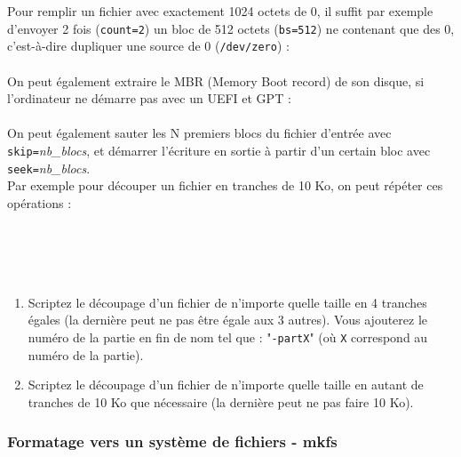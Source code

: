 Pour remplir un fichier avec exactement 1024 octets de $ 0 $, il suffit par exemple d'envoyer 2 fois (\texttt{count=2}) un bloc de 512 octets (\texttt{bs=512}) ne contenant que des $ 0 $, c'est-à-dire dupliquer une source de $ 0 $ (\texttt{/dev/zero}) :\\

\\

On peut également extraire le MBR (Memory Boot record) de son disque, si l'ordinateur ne démarre pas avec un UEFI et GPT :\\

\\


On peut également sauter les N premiers blocs du fichier d'entrée avec \texttt{skip=}\textit{nb\_blocs}, et démarrer l'écriture en sortie à partir d'un certain bloc avec \texttt{seek=}\textit{nb\_blocs}.\\

Par exemple pour découper un fichier en tranches de 10 Ko, on peut répéter ces opérations :\\

\\
\\
\\
\\

\bigskip

\begin{enumerate}
\item Scriptez le découpage d'un fichier de n'importe quelle taille en 4 tranches égales (la dernière peut ne pas être égale aux 3 autres). Vous ajouterez le numéro de la partie en fin de nom tel que : "\texttt{-partX}" (où \texttt{X} correspond au numéro de la partie).
\item Scriptez le découpage d'un fichier de n'importe quelle taille en autant de tranches de 10 Ko que nécessaire (la dernière peut ne pas faire 10 Ko).
\end{enumerate}


\bigskip

\subsubsection{Formatage vers un système de fichiers - mkfs}

